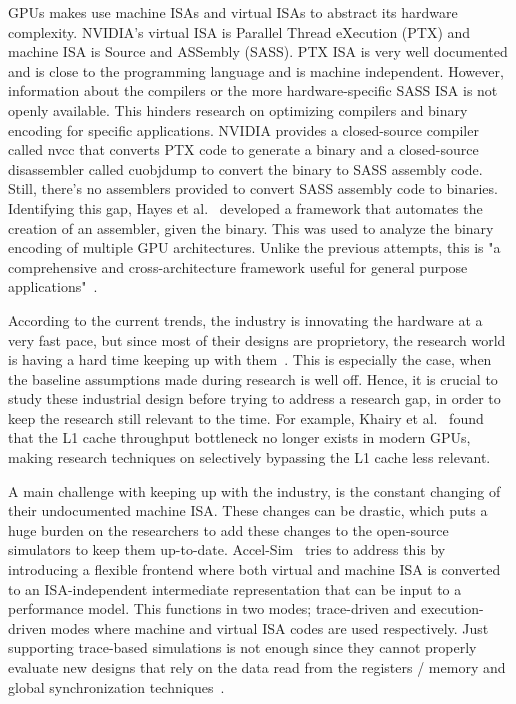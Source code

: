 \documentclass[conference]{IEEEtran}
\begin{document}
GPUs makes use machine ISAs and virtual ISAs to abstract its hardware complexity.
NVIDIA's virtual ISA is Parallel Thread eXecution (PTX) and machine ISA is Source and ASSembly (SASS).
PTX ISA is very well documented and is close to the programming language and is machine independent.
However, information about the compilers or the more hardware-specific SASS ISA is not openly available.
This hinders research on optimizing compilers and binary encoding for specific applications.
NVIDIA provides a closed-source compiler called nvcc that converts PTX code to generate a binary and a closed-source disassembler called cuobjdump to convert the binary to SASS assembly code.
Still, there's no assemblers provided to convert SASS assembly code to binaries.
Identifying this gap, Hayes et al.~\cite{Hayes2019} developed a framework that automates the creation of an assembler, given the binary.
This was used to analyze the binary encoding of multiple GPU architectures.
Unlike the previous attempts, this is "a comprehensive and cross-architecture framework useful for general purpose applications"~\cite{Hayes2019}.

According to the current trends, the industry is innovating the hardware at a very fast pace, but since most of their designs are proprietory, the research world is having a hard time keeping up with them~\cite{Khairy2020}.
This is especially the case, when the baseline assumptions made during research is well off.
Hence, it is crucial to study these industrial design before trying to address a research gap, in order to keep the research still relevant to the time.
For example, Khairy et al.~\cite{Khairy2020} found that the L1 cache throughput bottleneck no longer exists in modern GPUs, making research techniques on selectively bypassing the L1 cache less relevant.

A main challenge with keeping up with the industry, is the constant changing of their undocumented machine ISA.
These changes can be drastic, which puts a huge burden on the researchers to add these changes to the open-source simulators to keep them up-to-date.
Accel-Sim~\cite{Khairy2020} tries to address this by introducing a flexible frontend where both virtual and machine ISA is converted to an ISA-independent intermediate representation that can be input to a performance model.
This functions in two modes; trace-driven and execution-driven modes where machine and virtual ISA codes are used respectively.
Just supporting trace-based simulations is not enough since they cannot properly evaluate new designs that rely on the data read from the registers / memory and global synchronization techniques~\cite{Khairy2020}.
\end{document}
